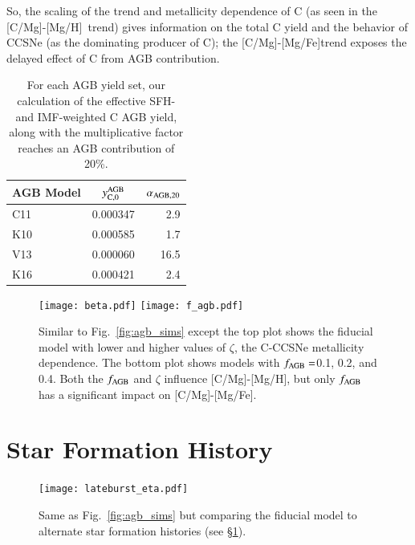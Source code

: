 \documentclass[12pt,oneside]{report}
\newcommand{\caah}{[C/Mg]-[Mg/H]}
\newcommand{\caafe}{[C/Mg]-[Mg/Fe]}
\begin{document}
So, the scaling of the trend and metallicity dependence of C (as seen in
the \caah~trend) gives information on the total C yield and the behavior of CCSNe (as the dominating producer of C); the \caafe trend exposes the delayed effect of C from AGB contribution.

\begin{table}
	\centering
    \caption[AGB net solar IMF yields]{For each AGB yield set, our calculation of the effective SFH- and IMF-weighted C AGB yield, along with the multiplicative factor reaches an AGB contribution of 20\%.}
	\label{tab:alpha_agb}
	\begin{tabular}{lcr} %
		\toprule 
		AGB Model & $y_{\rm C, 0}^{\rm AGB}$ & $\alpha_{\rm AGB, 20}$\\
        \midrule
		C11 & 0.000347 & 2.9\\
		K10 & 0.000585 & 1.7\\
		V13 & 0.000060 & 16.5\\
		K16 & 0.000421 & 2.4\\
		\bottomrule
	\end{tabular}
\end{table}


\begin{figure}
\centering
\texttt{[image: beta.pdf]}
\texttt{[image: f\_agb.pdf]}

\caption[Adjusted yield models]{Similar to Fig.~\ref{fig:agb_sims} except the top plot shows the fiducial model with lower and higher values of $\zeta$, the C-CCSNe metallicity dependence. The bottom plot shows models with $f_{\rm AGB}=$0.1, 0.2, and 0.4. Both the $f_{\rm AGB}$ and $\zeta$ influence \caah, but only $f_{\rm AGB}$ has a significant impact on \caafe.}
\label{fig:beta_f}
\end{figure}



\section{Star Formation History} \label{sec:sfh}



\begin{figure}
\centering
\texttt{[image: lateburst\_eta.pdf]}

\caption[Lateburst models]{Same as Fig.~\ref{fig:agb_sims} but comparing the fiducial model to alternate star formation histories (see \S \ref{sec:sfh}).}
\label{fig:sfh_models}

\end{figure}
\end{document}
